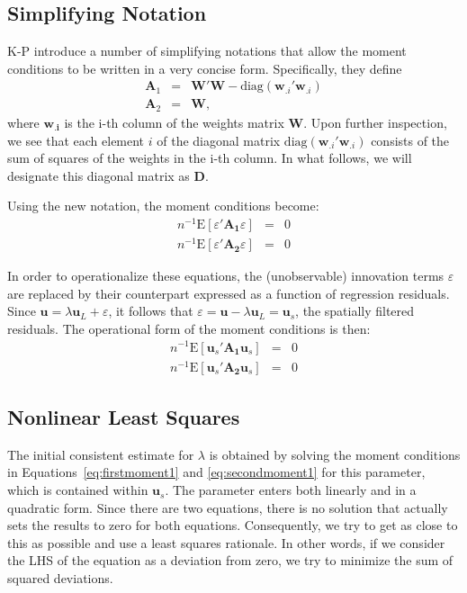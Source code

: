 \documentclass{article}
\begin{document}
\subsection{Simplifying Notation}
K-P introduce a number of simplifying notations that allow the moment conditions to
be written in a very concise form. Specifically, they define
\begin{eqnarray*}
\mathbf{A}_1 &=& \mathbf{W'W} - \mbox{diag} (\mathbf{w}_{.i}'\mathbf{w}_{.i})\\
\mathbf{A}_2 &=& \mathbf{W},
\end{eqnarray*}
where $\mathbf{w_{.i}}$ is the i-th column of the weights matrix $\mathbf{W}$. Upon
further inspection, we see that each element $i$ of the diagonal matrix 
$\mbox{diag} (\mathbf{w}_{.i}'\mathbf{w}_{.i})$ consists of the sum of squares of the
weights in the i-th column. In what follows, we will designate this diagonal matrix
as $\mathbf{D}$.

Using the new notation, the moment conditions become:
\begin{eqnarray*}
n^{-1} \mbox{E} [ \varepsilon ' \mathbf{A_1} \varepsilon ] &=& 0\\
n^{-1} \mbox{E} [ \varepsilon ' \mathbf{A_2} \varepsilon ] &=& 0
\end{eqnarray*}

In order to operationalize these equations, the (unobservable) innovation terms
$\varepsilon$ are replaced by their counterpart expressed as a function of regression
residuals. Since $\mathbf{u} = \lambda \mathbf{u}_L + \varepsilon$, it follows that
$\varepsilon = \mathbf{u} - \lambda \mathbf{u}_L = \mathbf{u}_s$, the spatially
filtered residuals. The operational form of the moment conditions is
then:
\begin{eqnarray}
n^{-1} \mbox{E} [ \mathbf{u}_s ' \mathbf{A_1} \mathbf{u}_s ] &=& 0 \label{eq:firstmoment1}\\
n^{-1} \mbox{E} [ \mathbf{u}_s ' \mathbf{A_2} \mathbf{u}_s ] &=& 0 \label{eq:secondmoment1}
\end{eqnarray}

\subsection{Nonlinear Least Squares}\label{ss:nonlinearls}
The initial consistent estimate for $\lambda$ is obtained by solving the moment
conditions in Equations~\ref{eq:firstmoment1} and \ref{eq:secondmoment1} for this parameter, which is contained within $\mathbf{u}_s$. The parameter
enters both linearly and in a quadratic form. Since there are two equations,
there is no solution that actually sets the results to zero for both equations.
Consequently, we try to get as close to this as possible and use a least squares
rationale. In other words, if we consider the LHS of the equation as a deviation
from zero, we try to minimize the sum of squared deviations.
\end{document}
